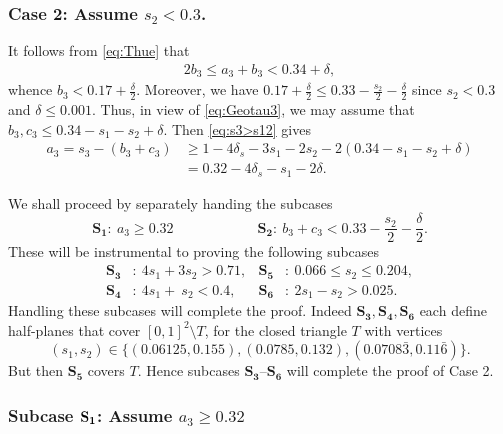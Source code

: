 \subsubsection*{Case 2:  Assume $s_2< 0.3$.}

It follows from \eqref{eq:Thue} that
\begin{align}\label{eq:2b3}
2b_3 \le a_3 + b_3 < 0.34+\delta,
\end{align} whence $b_3 < 0.17+\frac{\delta}{2}$. Moreover, we have  $0.17+\frac{\delta}{2} \leq
0.33-\frac{s_2}{2}-\frac{\delta}{2}$ since $s_2<0.3$ and $\delta\leq 0.001$. Thus, in view of  \eqref{eq:Geotau3}, we may assume that $b_3,c_3 \leq  0.34-s_1-s_2+ \delta$.
Then \eqref{eq:s3>s12} gives
\begin{align}
\label{eq:a_3>0.3-s_1}
a_3 = s_3 - (b_3+c_3)
&\ge 1-4\delta_s - 3s_1 - 2s_2 - 2(0.34 - s_1 - s_2+\delta) \nonumber\\
&= 0.32-4\delta_s -s_1-2\delta.
\end{align}


We shall proceed by separately handing the subcases
$$
\mathbf{S_1}:\ a_3\geq 0.32 \qquad\qquad\qquad  \mathbf{S_2}: \
b_3+c_3<0.33-\frac{s_2}{2}-\frac{\delta}{2}.
 $$
These will be instrumental to proving the following subcases
\begin{align*}
\mathbf{S_3}&:\ 4s_1+3s_2 > 0.71, & \mathbf{S_5}&:\
0.066\leq s_2\leq
0.204,\\
\mathbf{S_4}&:\ 4s_1+\ s_2 <0.4 ,
 & \mathbf{S_6}&:\
2s_1-s_2>0.025.
\end{align*}
Handling these subcases will complete the proof.
Indeed $\mathbf{S_3}, \mathbf{S_4}, \mathbf{S_6}$
each define half-planes that  cover $[0,1]^2\setminus T$, for the closed triangle $T$ with vertices
$$
(s_1,s_2)\in \{(0.06125,0.155), (0.0785,0.132), (
0.0708\bar3,
0.11\bar 6)\}.
$$
But then
$\mathbf{S_5}$ covers $T$. Hence subcases $\mathbf{S_3}$--$\mathbf{S_6}$ will complete the proof of Case 2.

\subsubsection*{Subcase $\bf{S_1}$: Assume $a_3\geq  0.32$}

